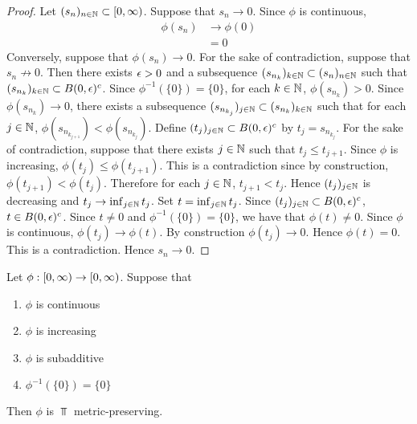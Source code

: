 \documentclass{book}
\begin{document}
\begin{proof}
	Let $(s_n)_{n \in \mathbb{N}} \subset [0,\infty)$. Suppose that $s_n \rightarrow 0$. Since $\phi$ is continuous, 
	\begin{align*}
		\phi(s_n) 
		& \rightarrow \phi(0) \\
		& = 0
	\end{align*}
	Conversely, suppose that $\phi(s_n) \rightarrow 0$. For the sake of contradiction, suppose that $s_n \not \rightarrow 0$. Then there exists $\epsilon >0$ and a subsequence $(s_{n_k})_{k \in \mathbb{N}} \subset (s_n)_{n \in \mathbb{N}}$ such that $(s_{n_k})_{k \in \mathbb{N}} \subset B(0, \epsilon)^c$. Since $\phi^{-1}(\{0\}) = \{0\}$, for each $k \in \mathbb{N}$, $\phi(s_{n_k}) >0$. Since $\phi(s_{n_k}) \rightarrow 0$, there exists a subsequence $(s_{n_{k_j}})_{j \in \mathbb{N}} \subset (s_{n_k})_{k \in \mathbb{N}}$ such that for each $j \in \mathbb{N}$, $\phi(s_{n_{k_{j+1}}}) < \phi(s_{n_{k_j}})$. Define $(t_j)_{j \in \mathbb{N}} \subset B(0,\epsilon)^c$ by $t_j = s_{n_{k_j}}$. For the sake of contradiction, suppose that there exists $j \in \mathbb{N}$ such that $t_j \leq t_{j+1}$. Since $\phi$ is increasing, $\phi(t_j) \leq \phi(t_{j+1})$. This is a contradiction since by construction, $\phi(t_{j+1}) < \phi(t_j)$. Therefore for each $j \in \mathbb{N}$, $t_{j+1} < t_j$. Hence $(t_j)_{j \in \mathbb{N}}$ is decreasing and $t_j \rightarrow \inf_{j \in \mathbb{N}} t_j$. Set $t = \inf_{j \in \mathbb{N}} t_j$. Since $(t_j)_{j \in \mathbb{N}} \subset B(0, \epsilon)^c$, $t \in B(0, \epsilon)^c$. Since $t \neq 0$ and $\phi^{-1}(\{0\}) = \{0\}$, we have that $\phi(t) \neq 0$. Since $\phi$ is continuous, $\phi(t_j) \rightarrow \phi(t)$. By construction $\phi(t_j) \rightarrow 0$. Hence $\phi(t) = 0$. This is a contradiction. Hence $s_n \rightarrow 0$.
\end{proof}

\begin{ex} 
	Let $\phi: [0,\infty) \rightarrow [0,\infty)$. Suppose that
	\begin{enumerate}
		\item $\phi$ is continuous
		\item $\phi$ is increasing
		\item $\phi$ is subadditive
		\item $\phi^{-1}(\{0\}) = \{0\}$
	\end{enumerate}
	Then $\phi$ is $\Top$ metric-preserving.
\end{ex}
\end{document}
